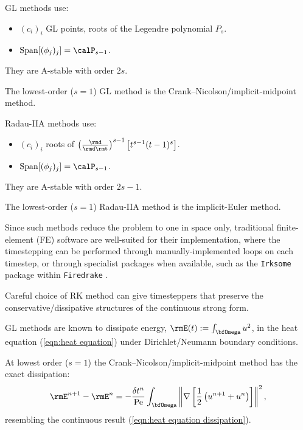     \begin{example}
        GL methods use:
        \begin{itemize}
            \item  $(c_{i})_{i}$ GL points, roots of the Legendre polynomial $P_{s}$.
            \item  ${\rm Span}[(\phi_{j})_{j}]  =  \calP_{s - 1}$.
        \end{itemize}
        They are A-stable with order $2s$. \BA{[Ref]}

        The lowest-order ($s  =  1$) GL method is the Crank--Nicolson/implicit-midpoint method.
    \end{example}

    \begin{example}
        Radau-IIA methods use:
        \begin{itemize}
            \item  $(c_{i})_{i}$ roots of $\left(\frac{\rmd}{\rmd\rmt}\right)^{s - 1}\left[t^{s - 1}(t - 1)^{s}\right]$.
            \item  ${\rm Span}[(\phi_{j})_{j}]  =  \calP_{s - 1}$.
        \end{itemize}
        They are A-stable with order $2s - 1$. \BA{[Ref]}

        The lowest-order ($s  =  1$) Radau-IIA method is the implicit-Euler method.
    \end{example}
    \line
    
    Since such methods reduce the problem to one in space only, traditional finite-element (FE) software are well-suited for their implementation, where the timestepping can be performed through manually-implemented loops on each timestep, or through specialist packages when available, such as the \texttt{Irksome} package within \texttt{Firedrake} \BA{[Ref]}.

    Careful choice of RK method can give timesteppers that preserve the conservative/dissipative structures of the continuous strong form.

    \line
    
    \begin{example}
        GL methods are known to dissipate energy, $\rmE(t)  :=  \int_{\bfOmega}u^{2}$, in the heat equation (\ref{eqn:heat equation}) under Dirichlet/Neumann boundary conditions. \BA{[Ref]}
        
        At lowest order ($s  =  1$) the Crank--Nicolson/implicit-midpoint method has the exact dissipation:
        \begin{equation}\label{eqn:heat equation dissipation implicit midpoint}
            \rmE^{n + 1} - \rmE^{n}  =  - \frac{\delta t^{n}}{\rmPe}\int_{\bfOmega}\left\|\nabla\left[\frac{1}{2}\left(u^{n + 1} + u^{n}\right)\right]\right\|^{2},
        \end{equation}
        resembling the continuous result (\ref{eqn:heat equation dissipation}).
    \end{example}
    
